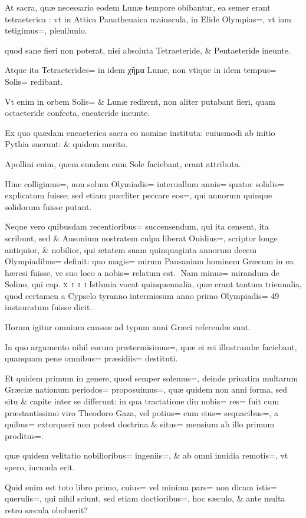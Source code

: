 \begin{parnumbers}
At sacra, quæ necessario eodem Lunæ tempore obibantur, ea semer erant tetraeterica : vt in Attica Panathenaica maiuscula, in Elide Olympias=, vt iam tetigimus=, plenilunio.

quod sane fieri non poterat, nisi absoluta Tetraeteride, \& Pentaeteride ineunte.

Atque ita Tetraeterides= in idem χῆμα Lunæ, non vtique in idem tempus= Solis= redibant.

Vt enim in orbem Solis= \& Lunæ redirent, non aliter putabant fieri, quam octaeteride confecta, eneateride ineunte.

Ex quo quædam eneaeterica sacra eo nomine instituta: cuiusmodi ab initio Pythia suerunt: \& quidem merito.

Apollini enim, quem eundem cum Sole faciebant, erant attributa.

Hinc colligimus=, non solum Olymiadis= interuallum annis= quator solidis= explicatum fuisse; sed etiam puerliter peccare eos=, qui annorum quinque solidorum fuisse putant.

Neque vero quibusdam recentioribus= succensendum, qui ita censent, ita scribunt, sed \& Ausonium nostratem culpa liberat Ouidius=, scriptor longe antiquior, \& nobilior, qui ætatem suam quinquaginta annorum decem Olympiadibus= definit: quo magis= mirum Pausaniam hominem Græcum in ea hæresi fuisse, ve suo loco a nobis= relatum
est.
Nam minus= mirandum de Solino, qui cap. \textsc{x~i~i~i} Isthmia vocat quinquennalia, quæ erant tantum triennalia, quod certamen a Cypselo tyranno intermissum anno primo Olympiadis= 49 instauratum fuisse dicit.

Horum igitur omnium caussæ ad typum anni Græci referendæ sunt.

In quo argumento nihil eorum prætermisimus=, quæ ei rei illustrandæ faciebant, quanquam pene omnibus= præsidiis= destituti.

Et quidem primum in genere, quod semper solemus=, deinde priuatim multarum Græciæ nationum periodos= proposuimus=, quæ quidem non anni forma, sed situ \& capite inter se differunt: in qua tractatione diu nobis= res= fuit cum præstantissimo viro Theodoro Gaza, vel potius= cum eius= sequacibus=, a quibus= extorqueri non potest doctrina \& situs= mensium ab illo primum 
proditus=. 

quæ quidem velitatio nobilioribus= ingeniis=, \& ab omni inuidia remotis=, vt spero, iucunda erit.

Quid enim est toto libro primo, cuius= vel minima pars= non dicam istis= querulis=, qui nihil sciunt, sed etiam doctioribus=, hoc sæculo, \& ante multa retro sæcula oboluerit?


\end{parnumbers}
